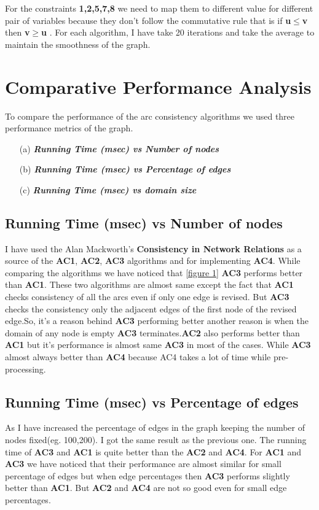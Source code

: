 \documentclass[12pt , conference]{IEEEtran}
\begin{document}
		For the constraints \textbf{1,2,5,7,8} we need to map them to different value for different pair of variables because they don't follow the commutative rule that is if \textbf{u$\leq$v} then \textbf{v$\geq$u} . For each algorithm, I have take 20 iterations and take the average to maintain the smoothness of the graph.
	
	\section{Comparative Performance Analysis}	To compare the performance of the arc consistency algorithms we used three performance metrics of the graph. 
	\begin{enumerate}
\item [(a)] \textit{\textbf{Running Time (msec) vs Number of nodes}}
\item [(b)] \textit{\textbf{Running Time (msec) vs Percentage of edges}}
\item [(c)] \textit{\textbf{Running Time (msec) vs domain size}}
	\\
	\end{enumerate}
	\subsection{Running Time (msec) vs Number of nodes}
	I have used the Alan Mackworth's \textbf{Consistency in Network Relations}\cite{DUMMY:1} as a source of the \textbf{AC1}, \textbf{AC2}, \textbf{AC3} algorithms and \cite{DUMMY:2} for implementing \textbf{AC4}. 
	While comparing the algorithms we have noticed that \ref{figure 1}  \textbf{AC3} performs better than \textbf{AC1}. These two algorithms are almost same except the fact that \textbf{AC1} checks consistency of all the arcs even if only one edge is revised. But \textbf{AC3} checks the consistency only the adjacent edges of the first node of the revised edge.So, it's a reason behind \textbf{AC3} performing better another reason is when the domain of any node is empty \textbf{AC3} terminates.\textbf{AC2} also performs better than \textbf{AC1} but it's performance is almost same \textbf{AC3} in most of the cases. While \textbf{AC3} almost always better than \textbf{AC4}\cite{DUMMY:3} because AC4 takes a lot of time while pre-processing. 
	\\
	\subsection{Running Time (msec) vs Percentage of edges}
	As I have increased the percentage of edges in the graph keeping the number of nodes fixed(eg. 100,200). I got the same result as the previous one. The running time of \textbf{AC3} and \textbf{AC1} is quite better than the \textbf{AC2} and \textbf{AC4}. For \textbf{AC1} and \textbf{AC3} we have noticed that their performance are almost similar for small percentage of edges but when edge percentages then \textbf{AC3} performs slightly better than \textbf{AC1}. But \textbf{AC2} and \textbf{AC4} are not so good even for small edge percentages.
	\\
\end{document}
